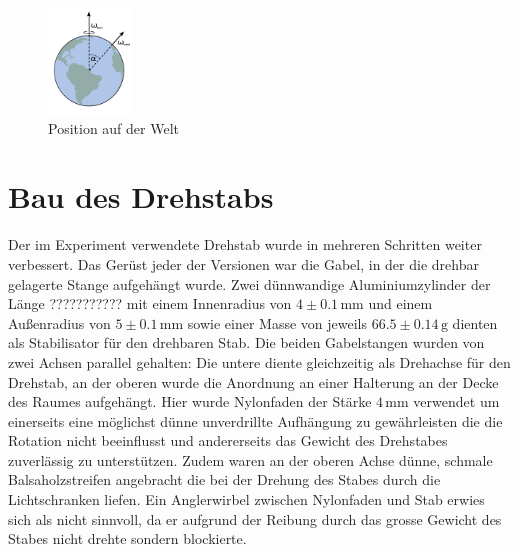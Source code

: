 \documentclass[11pt]{scrartcl}
\newcommand{\unit}[1]{\ensuremath{\,\mathrm{#1}}} %
\begin{document}
\begin{figure}[ht]
\begin{center}
\includegraphics[width=0.2\textwidth]{welt.pdf}
\end{center}
\vspace{-1.5\baselineskip}
\caption{Position auf der Welt}
\label{Welt}
\end{figure}

\section{Bau des Drehstabs} %


Der im Experiment verwendete Drehstab wurde in mehreren Schritten weiter verbessert. Das Ger\"ust jeder der Versionen war die Gabel, in der die drehbar gelagerte Stange aufgeh\"angt wurde. Zwei d\"unnwandige Aluminiumzylinder der L\"ange ??????????? mit einem Innenradius von $4\pm 0.1\unit{mm}$ und einem Au\ss{}enradius von $5\pm 0.1\unit{mm}$ sowie einer Masse von jeweils $66.5\pm 0.14\unit{g}$ dienten als Stabilisator f\"ur den drehbaren Stab. Die beiden Gabelstangen wurden von zwei Achsen parallel gehalten: Die untere diente gleichzeitig als Drehachse f\"ur den Drehstab, an der oberen wurde die Anordnung an einer Halterung an der Decke des Raumes aufgeh\"angt. Hier wurde Nylonfaden der St\"arke $4\unit{mm}$
 verwendet um einerseits eine m\"oglichst d\"unne unverdrillte Aufh\"angung zu gew\"ahrleisten die die Rotation nicht beeinflusst und andererseits das Gewicht des Drehstabes zuverl\"assig zu unterst\"utzen. Zudem waren an der oberen Achse d\"unne, schmale Balsaholzstreifen angebracht die bei der Drehung des Stabes durch die Lichtschranken liefen. Ein Anglerwirbel zwischen Nylonfaden und Stab erwies sich als nicht sinnvoll, da er aufgrund der Reibung durch das grosse Gewicht des Stabes nicht drehte sondern blockierte.
\end{document}
